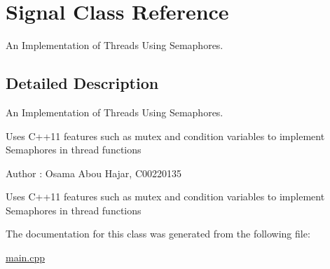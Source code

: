 \hypertarget{class_signal}{}\section{Signal Class Reference}
\label{class_signal}


An Implementation of Threads Using Semaphores.  




\subsection{Detailed Description}
An Implementation of Threads Using Semaphores. 

Uses C++11 features such as mutex and condition variables to implement Semaphores in thread functions \begin{DoxyAuthor}{Author}
\+: Osama Abou Hajar, C00220135
\end{DoxyAuthor}
Uses C++11 features such as mutex and condition variables to implement Semaphores in thread functions 

The documentation for this class was generated from the following file\+:\begin{DoxyCompactItemize}
\item 
\hyperlink{main_8cpp}{main.\+cpp}\end{DoxyCompactItemize}
